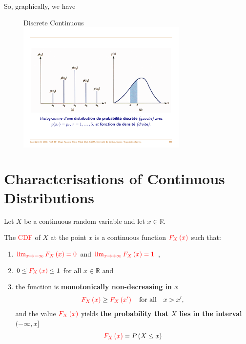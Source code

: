 \documentclass[notes=show,smaller,handout]{beamer}\usepackage[]{graphicx}\usepackage[]{color}
\renewcommand{\Pr}{P}
\begin{document}
\begin{frame}{\secname}
  So, graphically, we have \\ \bigskip
  \begin{figure}
  \hspace{1cm} Discrete \hspace{3cm} Continuous\\
  \includegraphics[width=0.75\textwidth,height=0.5\textheight]{img/discr_vs_cont.pdf}
  \end{figure}
\end{frame}%

\section{Characterisations of Continuous Distributions}

\begin{frame}{\secname}
  \begin{definition}
  Let $X$ be a continuous random variable and let $x\in \mathbb{R}$.
  \medskip

  The \textcolor{red}{CDF} of $X$ at the point $x$ is a continuous function
  $\color{red}{F_{X}\left( x\right)}$ such that:
  \begin{enumerate}
  \item $\color{red}{\lim_{x\rightarrow -\infty}F_{X}\left(x\right)}=0$ and $\color{red}{\lim_{x\rightarrow +\infty}F_{X}\left(x\right)}=1$ ,\medskip
  \item $0\leq \color{red}F_{X}\left( x\right)\color{black} \leq 1$ for all $x\in \mathbb{R}$ and\medskip
  \item the function is \textbf{monotonically non-decreasing in $x$}
  $$\color{red} F_{X}\left( x\right)\color{black}\geq \color{red}F_{X}\left( x'\right)\color{black}\quad\mbox{for all}\quad x>x',
  $$and the value $\color{red}F_{X}\left( x\right)\color{black} $ yields \textbf{the probability that $X$ lies in the interval $(-\infty,x]$}
  $$\color{red}F_{X}\left( x\right) \color{black} = \Pr \left( X\leq x\right)$$
  \end{enumerate}
  \end{definition}
\end{frame}
\end{document}
